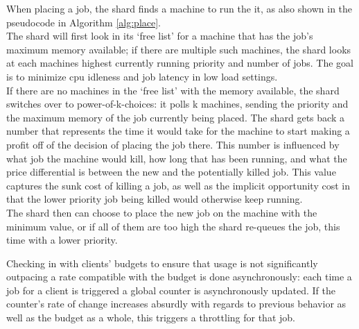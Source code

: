 When placing a job, the shard finds a machine to run the it, as also shown in
the pseudocode in Algorithm \ref{alg:place}. \\
The shard will first look in its `free list' for a machine that has the job's
maximum memory available; if there are multiple such machines, the shard looks
at each machines highest currently running priority and number of jobs. The goal
is to minimize cpu idleness and job latency in low load settings. \\
If there are no machines in the `free list' with the memory available, the shard
switches over to power-of-k-choices: it polls k machines, sending the priority
and the maximum memory of the job currently being placed. The shard gets back a
number that represents the time it would take for the machine to start making a
profit off of the decision of placing the job there. This number is influenced
by what job the machine would kill, how long that has been running, and what the
price differential is between the new and the potentially killed job. This value
captures the sunk cost of killing a job, as well as the implicit opportunity
cost in that the lower priority job being killed would otherwise keep running.
\\ 
The shard then can choose to place the new job on the machine with the minimum
value, or if all of them are too high the shard re-queues the job, this time
with a lower priority.

Checking in with clients' budgets to ensure that usage is not significantly
outpacing a rate compatible with the budget is done asynchronously: each time a
job for a client is triggered a global counter is asynchronously updated. If the
counter's rate of change increases absurdly with regards to previous behavior as
well as the budget as a whole, this triggers a throttling for that job.
